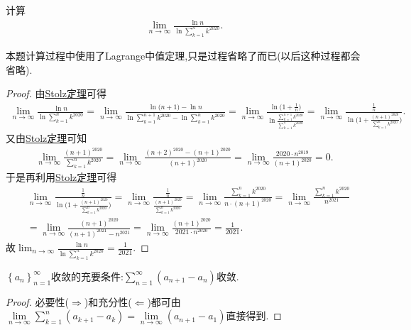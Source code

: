 \documentclass[lang=cn,newtx,10pt,scheme=chinese]{elegantbook}
\begin{document}
\begin{example}
   计算
\begin{align*}
   \lim_{n \to \infty} \frac{\ln n}{\ln \sum\limits_{k = 1}^{n} k^{2020}}.
\end{align*}
\end{example}
\begin{note}
   本题计算过程中使用了Lagrange中值定理,只是过程省略了而已(以后这种过程都会省略).
\end{note}
\begin{proof}
   由\hyperref[theorem:Stolz定理]{Stolz定理}可得
   \begin{align*}
      \lim_{n \to \infty} \frac{\ln n}{\ln \sum\limits_{k = 1}^{n} k^{2020}}=\lim_{n\rightarrow \infty} \frac{\ln\mathrm{(}n+1)-\ln n}{\ln \sum\limits_{k=1}^{n+1}{k^{2020}}-\ln \sum\limits_{k=1}^n{k^{2020}}}=\lim_{n\rightarrow \infty} \frac{\ln\mathrm{(}1+\frac{1}{n})}{\ln \frac{\sum\limits_{k=1}^{n+1}{k^{2020}}}{\sum\limits_{k=1}^n{k^{2020}}}}=\lim_{n\rightarrow \infty} \frac{\frac{1}{n}}{\ln\mathrm{(}1+\frac{(n+1)^{2020}}{\sum\limits_{k=1}^n{k^{2020}}})}.
   \end{align*}
   又由\hyperref[theorem:Stolz定理]{Stolz定理}可知
   \begin{align*}
      \lim_{n\rightarrow \infty} \frac{(n+1)^{2020}}{\sum\limits_{k=1}^n{k^{2020}}}=\lim_{n\rightarrow \infty} \frac{(n+2)^{2020}-(n+1)^{2020}}{(n+1)^{2020}}=\lim_{n\rightarrow \infty} \frac{2020\cdot n^{2019}}{(n+1)^{2020}}=0.
   \end{align*}
于是再利用\hyperref[theorem:Stolz定理]{Stolz定理}可得
\begin{align*}
   &\lim_{n\rightarrow \infty} \frac{\frac{1}{n}}{\ln\mathrm{(}1+\frac{(n+1)^{2020}}{\sum\limits_{k=1}^n{k^{2020}}})}=\lim_{n\rightarrow \infty} \frac{\frac{1}{n}}{\frac{(n+1)^{2020}}{\sum\limits_{k=1}^n{k^{2020}}}}=\lim_{n\rightarrow \infty} \frac{\sum\limits_{k=1}^n{k^{2020}}}{n\cdot (n+1)^{2020}}=\lim_{n\rightarrow \infty} \frac{\sum\limits_{k=1}^n{k^{2020}}}{n^{2021}}  \\
   &=\lim_{n\rightarrow \infty} \frac{(n+1)^{2020}}{(n+1)^{2021}-n^{2021}}=\lim_{n\rightarrow \infty} \frac{(n+1)^{2020}}{2021\cdot n^{2020}}=\frac{1}{2021}.
\end{align*}
故$\lim_{n \to \infty} \frac{\ln n}{\ln \sum\limits_{k = 1}^{n} k^{2020}}=\frac{1}{2021}$.
\end{proof}

\begin{proposition}[数列收敛的级数形式]\label{proposition:数列收敛的级数形式}
   $\left\{ a_n \right\} _{n=1}^{\infty}$收敛的充要条件:$\sum\limits_{n=1}^{\infty}{\left( a_{n+1}-a_n \right)}$收敛.
\end{proposition}
\begin{proof}
   必要性($\Rightarrow$)和充分性($\Leftarrow$)都可由$\underset{n\rightarrow \infty}{\lim}\sum\limits_{k=1}^n{\left( a_{k+1}-a_k \right)}=\underset{n\rightarrow \infty}{\lim}\left( a_{n+1}-a_1 \right)$直接得到.
\end{proof}
\end{document}
